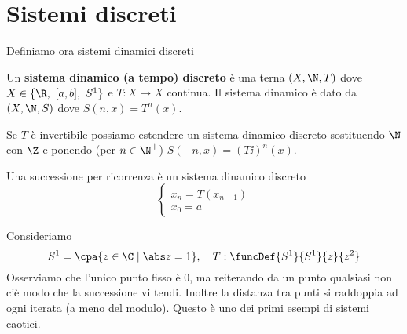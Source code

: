 
\section*{Sistemi discreti}
Definiamo ora sistemi dinamici discreti
\begin{definition}
Un \textbf{sistema dinamico (a tempo) discreto} \`e una terna $(X,\N,T)$ dove $X\in\{\R,\ [a,b],\ S^1\}$ e $T:X\to X$ continua. Il sistema dinamico \`e dato da $(X,\N, S)$ dove $S(n,x)=T^n(x)$.
\end{definition}
\begin{remark}
Se $T$ \`e invertibile possiamo estendere un sistema dinamico discreto sostituendo $\N$ con $\Z$ e ponendo (per $n\in\N^+$) $S(-n,x)=(T\ii)^n(x)$.
\end{remark}

\begin{example}
Una successione per ricorrenza \`e un sistema dinamico discreto
\[\begin{cases}
x_n=T(x_{n-1})\\
x_0=a
\end{cases}\]
\end{example}

\begin{example}
Consideriamo
\[S^1=\cpa{z\in\C\mid \abs z=1},\quad T:\funcDef{S^1}{S^1}{z}{z^2}\]
Osserviamo che l'unico punto fisso \`e $0$, ma reiterando da un punto qualsiasi non c'\`e modo che la successione vi tendi. Inoltre la distanza tra punti si raddoppia ad ogni iterata (a meno del modulo). Questo \`e uno dei primi esempi di sistemi caotici.
\end{example}